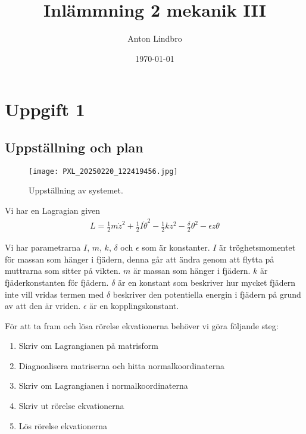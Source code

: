 \documentclass[a4paper]{article}
\title{Inlämmning 2 mekanik III}
\author{Anton Lindbro}
\date{\today}
\begin{document}
\maketitle

\section{Uppgift 1}

\subsection{Uppställning och plan}

\begin{figure}[H]
    \begin{small}
        \begin{center}
            \texttt{[image: PXL\_20250220\_122419456.jpg]}
        \end{center}
        \caption{Uppställning av systemet.}
        \label{fig:Uppställning}
    \end{small}
\end{figure}


Vi har en Lagragian given
\begin{align*}
    L  = \frac{1}{2} m \dot{z}^2 + \frac{1}{2} I \dot{\theta}^2 - \frac{1}{2}kz^2 - \frac{\delta}{2}\theta^2 - \epsilon z \theta   
\end{align*}

Vi har parametrarna $I$, $m$, $k$, $\delta$ och $\epsilon$ som är konstanter. $I$ är tröghetsmomentet för massan som hänger i fjädern, denna går att ändra genom att flytta på muttrarna som sitter på vikten. $m$ är massan som hänger i fjädern. $k$ är fjäderkonstanten för fjädern. $\delta$ är en konstant som beskriver hur mycket fjädern inte vill vridas termen med $\delta$ beskriver den potentiella energin i fjädern på grund av att den är vriden. $\epsilon$ är en kopplingskonstant. 

För att ta fram och lösa rörelse ekvationerna behöver vi göra följande steg:
\begin{enumerate}
    \item Skriv om Lagrangianen på matrisform
    \item Diagnoalisera matriserna och hitta normalkoordinaterna
    \item Skriv om Lagrangianen i normalkoordinaterna
    \item Skriv ut rörelse ekvationerna
    \item Lös rörelse ekvationerna
\end{enumerate}
\end{document}
